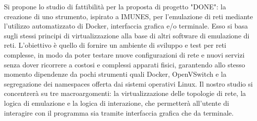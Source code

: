 \noindent
Si propone lo studio di fattibilità per la proposta di progetto "DONE": la creazione di uno strumento, ispirato a IMUNES, per l'emulazione di reti mediante l'utilizzo automatizzato di Docker, interfaccia grafica e/o terminale.
\newline\newline
Esso si basa sugli stessi principi di virtualizzazione alla base di altri software di emulazione di reti. L'obiettivo è quello di fornire un ambiente di sviluppo e test per reti complesse, in modo da poter testare nuove configurazioni di rete e nuovi servizi senza dover ricorrere a costosi e complessi apparati fisici, garantendo allo stesso momento dipendenze da pochi strumenti quali Docker, OpenVSwitch e la segregazione dei namespaces offerta dai sistemi operativi Linux.
\newline\newline
Il nostro studio si concentrerà su tre macroargomenti: la virtualizzazione delle topologie di rete, la logica di emulazione e la logica di interazione, che permetterà all'utente di interagire con il programma sia tramite interfaccia grafica che da terminale.